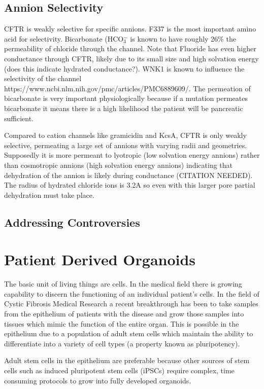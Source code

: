 \subsection {Annion Selectivity}
CFTR is weakly selective for specific annions. F337 is the most important amino acid for selectivity. Bicarbonate (HCO$_3^-$ is known to have roughly 26\% the permeability of chloride through the channel. Note that Fluoride has even higher conductance through CFTR, likely due to its small size and high solvation energy (does this indicate hydrated conductance?). WNK1 is known to influence the selectivity of the channel https://www.ncbi.nlm.nih.gov/pmc/articles/PMC6889609/. The permeation of bicarbonate is very important physiologically because if a mutation permeates bicarbonate it means there is a high likelihood the patient will be pancreatic sufficient. 

Compared to cation channels like gramicidin and KcsA, CFTR is only weakly selective, permeating a large set of annions with varying radii and geometries. Supposedly it is more permeant to lyotropic (low solvation energy annions) rather than cosmotropic annions (high solvation energy annions) indicating that dehydration of the annion is likely during conductance (CITATION NEEDED). The radius of hydrated chloride ions is 3.2A\cite{yang2002} so even with this larger pore partial dehydration must take place. 

\subsection{Addressing Controversies}

\section{Patient Derived Organoids}
The basic unit of living things are cells. In the medical field there is growing capability to discern the functioning of an individual patient's cells. In the field of Cystic Fibrosis Medical Research a recent breakthrough has been to take samples from the epithelium of patients with the disease and grow those samples into tissues which mimic the function of the entire organ\cite{depoel2020}. This is possible in the epithelium due to a population of adult stem cells which maintain the ability to differentiate into a variety of cell types (a property known as pluripotency). 

Adult stem cells in the epithelium are preferable because other sources of stem cells such as induced pluripotent stem cells (iPSCs) require complex, time consuming protocols to grow into fully developed organoids. 


